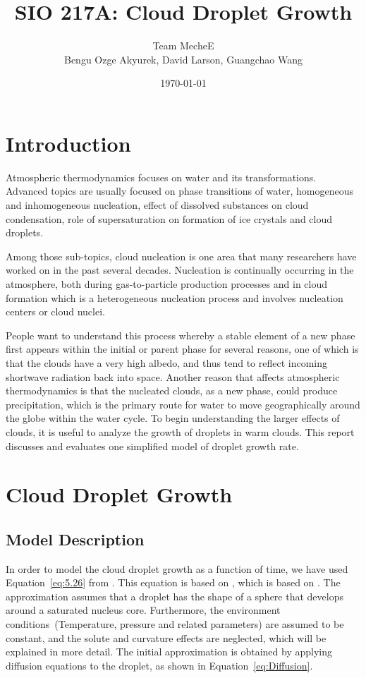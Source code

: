 \documentclass[]{article}
\title{SIO 217A: Cloud Droplet Growth}
\author{Team MecheE \\ Bengu Ozge Akyurek, David Larson, Guangchao Wang}
\date{\today}
\begin{document}
\maketitle


\section{Introduction}
Atmospheric thermodynamics focuses on water and its transformations. Advanced
topics are usually focused on phase transitions of water, homogeneous and
inhomogeneous nucleation, effect of dissolved substances on cloud condensation,
role of supersaturation on formation of ice crystals and cloud droplets.

Among those sub-topics, cloud nucleation is one area that
many researchers have worked on in the past several decades. Nucleation is
continually occurring in the atmosphere, both during gas-to-particle production
processes and in cloud formation which is a heterogeneous nucleation process
and involves nucleation centers or cloud nuclei.

People want to understand this process whereby a stable element of a new phase
first appears within the initial or parent phase for several reasons, one of
which is that the clouds have a very high albedo, and thus tend to reflect
incoming shortwave radiation back into space. Another reason that affects
atmospheric thermodynamics is that the nucleated clouds, as a new phase, could
produce precipitation, which is the primary route for water to move
geographically around the globe within the water cycle. To begin understanding
the larger effects of clouds, it is useful to analyze the growth of droplets in
warm clouds. This report discusses and evaluates one simplified model of
droplet growth rate.


\section{Cloud Droplet Growth}

\subsection{Model Description}
In order to model the cloud droplet growth as a function of time, we have used
Equation~\eqref{eq:5.26} from \cite{Curry}. This equation is based on
\cite{Mason}, which is based on \cite{Best}. The approximation assumes that a
droplet has the shape of a sphere that develops around a saturated nucleus
core. Furthermore, the environment conditions~(Temperature, pressure and
related parameters) are assumed to be constant, and the solute and curvature
effects are neglected, which will be explained in more detail. The initial
approximation is obtained by applying diffusion equations to the droplet, as
shown in Equation~\eqref{eq:Diffusion}.
\end{document}
